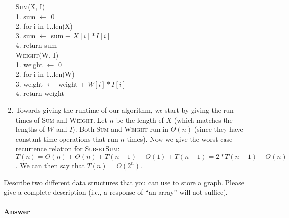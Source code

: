 \documentclass{article}
\begin{document}
\begin{enumerate}
\begin{algorithm}
        \textsc{Sum}(X, I) \\
        1.  \hspace{0em} sum $\leftarrow$ 0 \\
        2.  \hspace{0em} for i in 1..len(X) \\
        3.  \hspace{2em}     sum $\leftarrow$ sum + $X[i]*I[i]$ \\
        4.  \hspace{0em} return sum \\

        \textsc{Weight}(W, I) \\
        1.  \hspace{0em} weight $\leftarrow$ 0 \\
        2.  \hspace{0em} for i in 1..len(W) \\
        3.  \hspace{2em}     weight $\leftarrow$ weight + $W[i]*I[i]$ \\
        4.  \hspace{0em} return weight
    \end{algorithm}
    \newpage
    \item Towards giving the runtime of our algorithm, we start by giving the run times of \textsc{Sum} and \textsc{Weight}.
    Let $n$ be the length of $X$ (which matches the lengths of $W$ and $I$).
    Both \textsc{Sum} and \textsc{Weight} run in $\Theta(n)$ (since they have constant time operations that run $n$ times).
    Now we give the worst case recurrence relation for \textsc{SubsetSum}: $T(n) = \Theta(n) + \Theta(n) + T(n-1) + O(1) + T(n-1) = 2*T(n-1) + \Theta(n)$.
    We can then say that $T(n) = O(2^n)$.
\end{enumerate}




\nextprob
{}

Describe two different data structures that you can use to store a graph.
Please give a complete description (i.e., a response of ``an array'' will not
suffice).

\paragraph{Answer}

\end{document}
